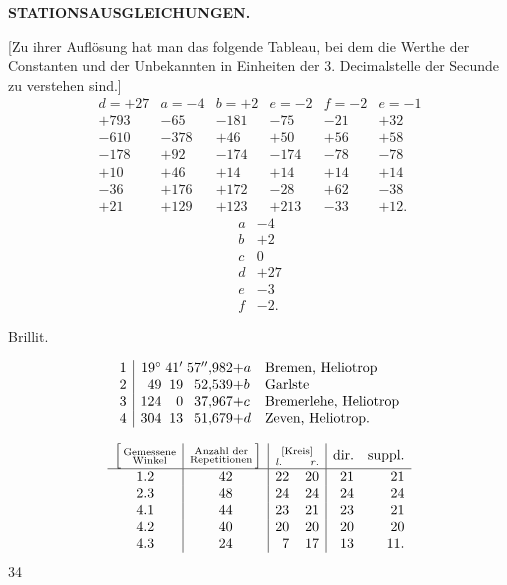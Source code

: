 \par\clearpage
\noindent\null\hfill{\small\textbf{STATIONSAUSGLEICHUNGEN.}}\hfill{}\par\medskip

[Zu ihrer Auflösung hat man das folgende Tableau, bei dem die Werthe der Constanten und der Unbekannten in Einheiten der 3. Decimalstelle der Secunde zu verstehen sind.]
\[
\begin{array}{c|c|c|c|c|c}
 d=+27&a=-4&b=+2&e=-2&f=-2&e=-1\\
 \hline
 +793&-65&-181&-75&-21&+32\\
 -610&-378&+46&+50&+56&+58\\
 -178&+92&-174&-174&-78&-78\\
 +10&+46&+14&+14&+14&+14\\
 -36&+176&+172&-28&+62&-38\\
 +21&+129&+123&+213&-33&+12.
\end{array}
\]
\[
\begin{array}{r|r}
 a&-4\\
 b&+2\\
 c&0\\
 d&+27\\
 e&-3\\
 f&-2.
\end{array}
\]

\medskip
{\centering
[2.]\par{} Brillit.\par{}\par}
\[
\begin{array}{@{}r|r@{\;}r@{\;}r@{}l@{\quad}l@{}}
 1&19^\circ&41'&57''{,}982&+a&\text{Bremen, Heliotrop}\\
 2&49&19&52{,}539&+b&\text{Garlste}\\
 3&124&0&37{,}967&+c&\text{Bremerlehe, Heliotrop}\\
 4&304&13&51{,}679&+d&\text{Zeven, Heliotrop.}
\end{array}
\]
{\centering[Beobachtungstableau.]\par}
{\small
\[
\begin{array}{c|c|rr|rr}
 \Bigl[\,\substack{\text{Gemessene}\\\text{Winkel}}&
 \substack{\text{Anzahl der}\\\text{Repetitionen}}\,\Bigr]&
 \multicolumn{2}{c|}{\substack{\text{[Kreis]}\\\mathit{l.}\qquad\mathit{r.}}}&
 \text{dir.}&\text{suppl.}\\
 \hline
 1.2&42&22&20&21&21\\
 2.3&48&24&24&24&24\\
 4.1&44&23&21&23&21\\
 4.2&40&20&20&20&20\\
 4.3&24&7&17&13&11.
\end{array}
\]
}
\hfill{\small 34}\hspace*{.12\linewidth}\par

